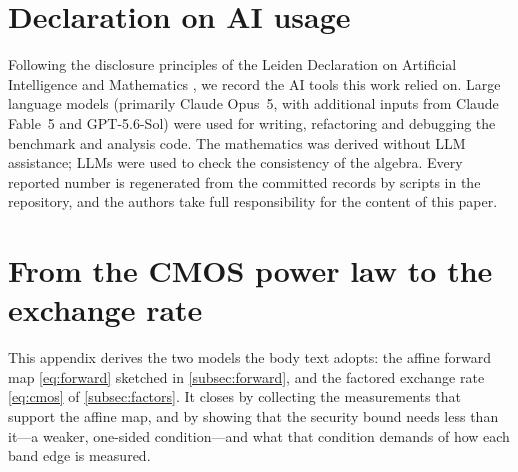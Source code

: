 \documentclass{article}
\theoremstyle{plain}
\theoremstyle{definition}
\theoremstyle{remark}
\begin{document}
\section*{Declaration on AI usage}
Following the disclosure principles of the Leiden Declaration on Artificial
Intelligence and Mathematics \citep{alper2026leiden}, we record the AI tools
this work relied on. Large language models (primarily Claude Opus~5, with additional inputs from Claude Fable~5 and
GPT-5.6-Sol) were used for writing,
refactoring and debugging the benchmark and analysis code. The mathematics was derived without LLM assistance; LLMs were used to check the consistency of the algebra. Every reported number is regenerated from the committed records by scripts in the repository, and the authors take full
responsibility for the content of this paper.




\newpage
\appendix
\onecolumn

\section{From the CMOS power law to the exchange rate}
\label{app:cmos}

This appendix derives the two models the body text adopts: the affine
forward map \cref{eq:forward} sketched in \cref{subsec:forward}, and the
factored exchange rate \cref{eq:cmos} of \cref{subsec:factors}. It closes
by collecting the measurements that support the affine map, and by showing
that the security bound needs less than it---a weaker, one-sided
condition---and what that condition demands of how each band edge is
measured.
\end{document}
